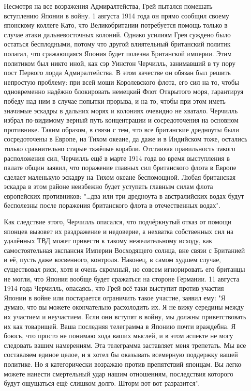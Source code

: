 Несмотря на все возражения Адмиралтейства, Грей пытался помешать вступлению Японии в войну. 1 августа 1914 года он прямо сообщил своему японскому коллеге Като, что Великобритании потребуется помощь только в случае атаки дальневосточных колоний. Однако усилиям Грея суждено было остаться бесплодными, потому что другой влиятельный британский политик полагал, что сражающаяся Япония будет полезна Британской империи. Этим политиком был никто иной, как сэр Уинстон Черчилль, занимавший в ту пору пост Первого лорда Адмиралтейства. В этом качестве он обязан был решить непростую проблему: при всей мощи Королевского флота, его сил на то, чтобы одновременно надёжно блокировать немецкий Флот Открытого моря, гарантируя победу над ним в случае попытки прорыва, и на то, чтобы при этом иметь значимые эскадры в дальних морях и колониях очевидно не хватало. Черчилль избрал по-видимому верный путь концентрации и сосредоточения на основном противнике. Таким образом, в связи с тем, что все британские дредноуты были сосредоточены в Европе, на Тихом океане, да даже и в Индийском тоже, остались только сравнительно старые тяжёлые корабли. Отстаивая правильность такого расположения сил, Черчилль ещё в марте 1914 года во время выступления в палате общин заявил, что поражение главных сил британского флота в Европе сделает маленькую эскадру на Тихом океане беспомощной. Любая британская эскадра в этом районе неизбежно будет уступать главным силам флота европейских противников: "…два или три дредноута в австралийских водах будут бесполезны после поражения британского флота в отечественных водах".

Как следствие этого, Черчилль опасался, что подчёркнутый отказ от помощи японцев вызовет их раздражение и недоверие, а нехватка собственных сил на удалённых ТВД может привести к такому нежелательному исходу, как самостоятельная экспансия Империи Восходящего солнца, вне связи с Британией и её, пусть даже косвенного, контроля. Наконец, в самом худшем случае, существовал риск, хотя и очень скромный, но совсем игнорировать его британцы не могли, что Япония вообще будет сражаться на стороне Германии. 11 августа 1914 года Черчилль, опасаясь, что Грей всё-таки выступит против участия Японии в войне или постарается ограничить такое участие, заявил ему: "Я думаю, что вы можете окончательно расхолодить их. Я не вижу середины между их участием и неучастием. Если они вступят в войну, мы должны приветствовать их как товарищей. Ваша последняя телеграмма в Японию почти враждебна. Я боюсь, что просто не понимаю хода ваших мыслей, и в этом аспекте не могу следовать вашим намерениям. Эта телеграмма заставляет меня трепетать. Мы все составляем единое целое, и я хотел бы оказывать всемерную поддержку вашей политике. Но я категорически возражаю против препятствий японцам. Вы легко можете нанести смертельный удар нашим отношениям, последствия которого будут ощущаться ещё слишком долго. Шторм вот-вот разразится".

